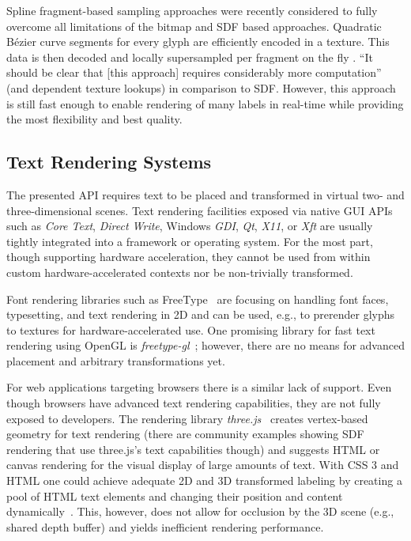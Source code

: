 Spline fragment-based sampling approaches were recently considered to fully overcome all limitations of the bitmap and SDF based approaches.
    Quadratic B\'ezier curve segments for every glyph are efficiently encoded in a texture.
    This data is then decoded and locally supersampled per fragment on the fly \cite{Dobbie2016}.
    \enquote{It should be clear that [this approach] requires considerably more computation}~\cite{Lengyel2017} (and dependent texture lookups) in comparison to SDF.
    However, this approach is still fast enough to enable rendering of many labels in real-time while providing the most flexibility and best quality.

\subsection{Text Rendering Systems}
\noindent
The presented API requires text to be placed and transformed in virtual two- and three-dimensional scenes. 
Text rendering facilities exposed via native GUI APIs such as \emph{Core Text}, \emph{Direct Write}, Windows \emph{GDI}, \emph{Qt}, \emph{X11}, or \emph{Xft} are usually tightly integrated into a framework or operating system. 
For the most part, though supporting hardware acceleration, they cannot be used from within custom hardware-accelerated contexts nor be non-trivially transformed.
 
Font rendering libraries such as FreeType~\cite{freetype1996} are focusing on handling font faces, typesetting, and text rendering in 2D and can be used, e.g., to prerender glyphs to textures for hardware-accelerated use.
One promising library for fast text rendering using OpenGL is \emph{freetype-gl}~\cite{freetypegl2011}; however, there are no means for advanced placement and arbitrary transformations yet.

For web applications targeting browsers there is a similar lack of support. 
Even though browsers have advanced text rendering capabilities, they are not fully exposed to developers.
The rendering library \emph{three.js}~\cite{cabello2010} creates vertex-based geometry for text rendering (there are community examples showing SDF rendering that use three.js's text capabilities though) and suggests HTML or canvas rendering for the visual display of large amounts of text.
With CSS 3 and HTML one could achieve adequate 2D and 3D transformed labeling by creating a pool of HTML text elements and changing their position and content dynamically~\cite{limberger2013}.
This, however, does not allow for occlusion by the 3D scene (e.g., shared depth buffer) and yields inefficient rendering performance.

